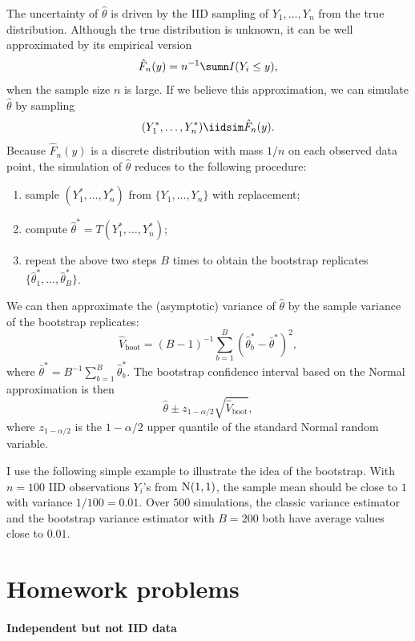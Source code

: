The uncertainty of $\hat\theta$ is driven by the IID sampling of $Y_1,\ldots, Y_n$ from the true distribution. Although the true distribution is unknown, it can be well approximated by its empirical version 
$$
\hat{F}_n(y) = n^{-1} \sumn I(Y_i \leq y),
$$
when the sample size $n$ is large. If we believe this approximation, we can simulate $\hat\theta$ by sampling 
$$
(Y_1^*,\ldots, Y_n^* ) \iidsim \hat{F}_n(y).
$$ 
Because $\hat{F}_n(y) $ is a discrete distribution with mass $1/n$ on each observed data point, the simulation of $\hat\theta$ reduces to the following procedure: 
\begin{enumerate}
\item
sample $(Y_1^*,\ldots, Y_n^* ) $ from $\{Y_1,\ldots, Y_n \}$ with replacement;
\item
compute $\hat{\theta}^* = T(Y_1^*, \ldots, Y_n^*)$;
\item
repeat the above two steps $B$ times to obtain the bootstrap replicates $\{  \hat{\theta}^*_1, \ldots, \hat{\theta}^*_B \}$.
\end{enumerate}




We can then approximate the (asymptotic) variance of $\hat\theta$ by the sample variance of the bootstrap replicates:
$$
\hat{V}_\text{boot} = (B-1)^{-1} \sum_{b=1}^B  (\hat{\theta}^*_b - \bar{\theta}^*)^2,
$$
where $\bar{\theta}^* = B^{-1}\sum_{b=1}^B \hat{\theta}^*_b $. The bootstrap confidence interval based on the Normal approximation is then
$$
\hat\theta \pm  z_{1-\alpha/2} \sqrt{\hat{V}_\text{boot} },
$$
where $z_{1-\alpha/2}$ is the $1-\alpha/2$ upper quantile of the standard Normal random variable.



I use the following simple example to illustrate the idea of the bootstrap. With $n=100$ IID observations $Y_i$'s from $\textsc{N}(1,1)$, the sample mean should be close to $1$ with variance $1/100 = 0.01$. Over $500$ simulations, the classic variance estimator and the bootstrap variance estimator with $B=200$ both have average values close to $0.01$. 





\section{Homework problems}

\paragraph{Independent but not IID data}
\label{hw::inid}

